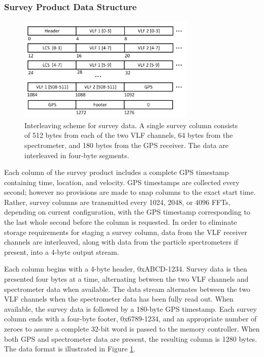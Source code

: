 \subsubsection{Survey Product Data Structure}
\begin{figure}[h]
\begin{center}
\includegraphics[width=20pc]{figures/vpm_figures/survey_datastructure_column_v2.png}

\caption[Interleaving scheme for survey data]{Interleaving scheme for survey data. A single survey column consists of 512 bytes from each of the two VLF channels, 64 bytes from the spectrometer, and 180 bytes from the GPS receiver. The data are interleaved in four-byte segments.}
\label{fig:survey_data_format}
\end{center}
\end{figure}
Each column of the survey product includes a complete GPS timestamp containing time, location, and velocity. GPS timestamps are collected every second; however no provisions are made to snap columns to the exact start time. Rather, survey columns are transmitted every 1024, 2048, or 4096 FFTs, depending on current configuration, with the GPS timestamp corresponding to the last whole second before the column is requested. In order to eliminate storage requirements for staging a survey column, data from the VLF receiver channels are interleaved, along with data from the particle spectrometers if present, into a 4-byte output stream.

Each column begins with a 4-byte header, 0xABCD-1234. Survey data is then presented four bytes at a time, alternating between the two VLF channels and spectrometer data when available. The data stream alternates between the two VLF channels when the spectrometer data has been fully read out. When available, the survey data is followed by a 180-byte GPS timestamp. Each survey column ends with a four-byte footer, 0x6789-1234, and an appropriate number of zeroes to assure a complete 32-bit word is passed to the memory controller. When both GPS and spectrometer data are present, the resulting column is 1280 bytes. The data format is illustrated in Figure \ref{fig:survey_data_format}.

